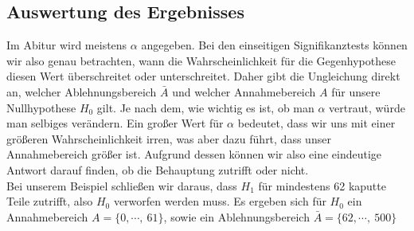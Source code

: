 \subsection{Auswertung des Ergebnisses}
Im Abitur wird meistens \(\alpha\) angegeben. Bei den einseitigen Signifikanztests können wir also genau betrachten, wann die Wahrscheinlichkeit für die Gegenhypothese diesen Wert überschreitet oder unterschreitet. Daher gibt die Ungleichung direkt an, welcher Ablehnungsbereich $\bar{A}$ und welcher Annahmebereich $A$ für unsere Nullhypothese $H_0$ gilt. Je nach dem, wie wichtig es ist, ob man \(\alpha\) vertraut, würde man selbiges verändern. Ein großer Wert für $\alpha$ bedeutet, dass wir uns mit einer größeren Wahrscheinlichkeit irren, was aber dazu führt, dass unser Annahmebereich größer ist. Aufgrund dessen können wir also eine eindeutige Antwort darauf finden, ob die Behauptung zutrifft oder nicht.\\
Bei unserem Beispiel schließen wir daraus, dass $H_1$ für mindestens 62 kaputte Teile zutrifft, also $H_0$ verworfen werden muss.
Es ergeben sich für $H_0$ ein Annahmebereich $A=\{0,\cdots,\ 61\}$, sowie ein Ablehnungsbereich $\bar{A}=\{62,\cdots,\ 500\}$

